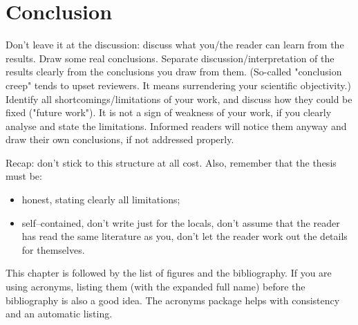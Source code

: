 \documentclass[a4paper,twoside, openright,12pt]{report}
\begin{document}



\chapter{Conclusion}

Don't leave it at the discussion: discuss what you/the reader can learn from the results. Draw some real conclusions. Separate discussion/interpretation of the results clearly from the conclusions you draw from them. (So-called "conclusion creep" tends to upset reviewers. It means surrendering your scientific objectivity.) Identify all shortcomings/limitations of your work, and discuss how they could be fixed ("future work"). It is not a sign of weakness of your work, if you clearly analyse and state the limitations. Informed readers will notice them anyway and draw their own conclusions, if not addressed properly.

\vspace{\baselineskip}
Recap: don't stick to this structure at all cost. Also, remember that the thesis must be:

\begin{itemize}
	\item honest, stating clearly all limitations;
	\item self--contained, don't write just for the locals, don't assume that the reader has read the same literature as you, don't let the reader work out the details for themselves.
\end{itemize}



This chapter is followed by the list of figures and the bibliography. If you are using acronyms, listing them (with the expanded full name) before the bibliography is also a good idea. The acronyms package helps with consistency and an automatic listing.




\cleardoublepage
{} 
\listoffigures 	 %


\cleardoublepage
{}


\end{document}

